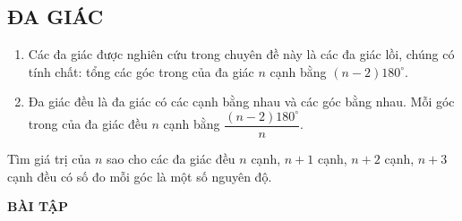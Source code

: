 \subsection{ĐA GIÁC}
\begin{enumerate}[1.]
	\item Các đa giác được nghiên cứu trong chuyên đề này là các đa giác lồi, chúng có tính chất: tổng các góc trong của đa giác $n$ cạnh bằng $\left(n-2\right)180^\circ$.
	\item Đa giác đều là đa giác có các cạnh bằng nhau và các góc bằng nhau. Mỗi góc trong của đa giác đều $n$ cạnh bằng $\dfrac{\left(n-2\right)180^\circ}{n}$.
\end{enumerate}
\begin{vd}
	Tìm giá trị của $n$ sao cho các đa giác đều $n$ cạnh, $n+1$ cạnh, $n+2$ cạnh, $n+3$ cạnh đều có số đo mỗi góc là một số nguyên độ.
\end{vd}
\begin{center}
	\large \textbf{BÀI TẬP}
\end{center}
